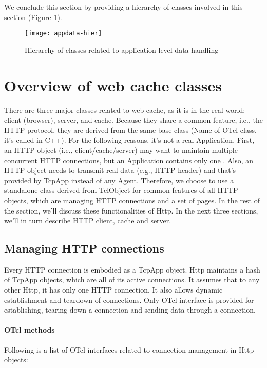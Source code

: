 We conclude this section by providing a hierarchy of classes involved
in this section (Figure \ref{fig:appdata-hier}).

\begin{figure}[tb]
  \begin{center}
    \texttt{[image: appdata-hier]}
    \caption{Hierarchy of classes related to application-level data handling}
    \label{fig:appdata-hier}
  \end{center}
\end{figure}


\section{Overview of web cache classes}
\label{sec:webcache-class}

There are three major classes related to web cache, as it is in the
real world: client (browser), server, and cache. Because they share a
common feature, i.e., the HTTP protocol, they are derived from the
same base class  (Name of OTcl class, it's called
 in C++). For the following reasons, it's not a real
Application.  First, an HTTP object (i.e., client/cache/server) may
want to maintain multiple concurrent HTTP connections, but an
Application contains only one .  Also, an HTTP object
needs to transmit real data (e.g., HTTP header) and that's provided by
TcpApp instead of any Agent. Therefore, we choose to use a standalone
class derived from TclObject for common features of all HTTP objects,
which are managing HTTP connections and a set of pages.  In the rest
of the section, we'll discuss these functionalities of Http. In the
next three sections, we'll in turn describe HTTP client, cache and
server.

\subsection{Managing HTTP connections}
\label{sec:webcache-connection}

Every HTTP connection is embodied as a TcpApp
object. Http maintains a hash of TcpApp objects, which are all of 
its active connections. It assumes that to any other Http, it 
has only one HTTP connection. It also allows dynamic establishment and 
teardown of connections. Only OTcl interface is provided for establishing,
tearing down a connection and sending data through a connection.

\paragraph{OTcl methods}
Following is a list of OTcl interfaces related to connection management 
in Http objects:

